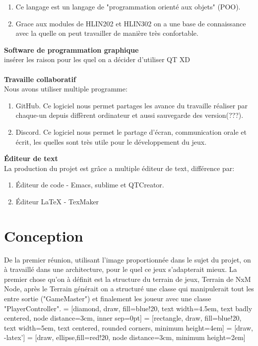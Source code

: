 \documentclass{article}
\begin{document}
\begin{enumerate}
\item Ce langage est un langage de "programmation orienté aux objets" (POO).
\item Grace aux modules de HLIN202 et HLIN302 on a une base de connaissance avec la quelle on peut travailler de manière très confortable.
\end{enumerate}
\textbf{\large Software de programmation graphique}\\
insérer les raison pour les quel on a décider d'utiliser QT XD\\~\\
\textbf{\large Travaille collaboratif}\\
Nous avons utiliser multiple programme:
\begin{enumerate}
\item GitHub. Ce logiciel nous permet partages les avance du travaille réaliser par chaque-un depuis diffèrent ordinateur et aussi sauvegarde des version(???).
\item Discord. Ce logiciel nous permet le partage d'écran, communication orale et écrit, les quelles sont très utile pour le développement du jeux.
\end{enumerate}
\textbf{\large Éditeur de text}\\
La production du projet est grâce a multiple éditeur de text, différence par:
\begin{enumerate}
\item Éditeur de code -
Emacs, sublime et QTCreator.
\item Éditeur \LaTeX{} - TexMaker
\end{enumerate} 
\newpage
\section{Conception}
De la premier réunion, utilisant l'image proportionnée dans le sujet du projet, on à travaillé dans une architecture, pour le quel ce jeux s'adapterait mieux.
La premier chose qu'on à définit est la structure du terrain de jeux, Terrain de NxM Node, après le Terrain générait on a structuré une classe qui manipulerait tout les entre sortie ("GameMaster") et finalement les joueur avec une classe "PlayerController".
 = [diamond, draw, fill=blue!20, 
    text width=4.5em, text badly centered, node distance=3cm, inner sep=0pt]
 = [rectangle, draw, fill=blue!20, 
    text width=5em, text centered, rounded corners, minimum height=4em]
 = [draw, -latex']
 = [draw, ellipse,fill=red!20, node distance=3cm,
    minimum height=2em]
    
\end{document}

